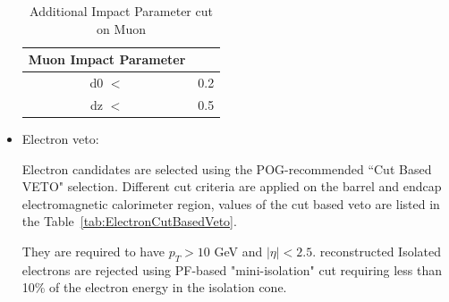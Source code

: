 \begin{itemize}
\begin{table}[htbp]
\fontsize{10 pt}{1.2 em}
\selectfont
\begin{centering}
\caption{\label{tab:MuonMediumIDImpactParameter} Additional Impact Parameter cut on Muon }
\hspace*{-4ex}
\begin{lrbox}{\closureBox}
\begin{tabular}{|c|c|}
\hline
  Muon Impact Parameter &     \\
\hline
  d0 $<$                & 0.2 \\
\hline
  dz $<$                & 0.5 \\
\hline
\end{tabular}
\end{lrbox}
\scalebox{0.80}{\usebox{\closureBox}}
\par\end{centering}
\end{table}

\item Electron veto:

Electron candidates are selected using the POG-recommended
``Cut Based VETO" selection. 
Different cut criteria are applied on the barrel and endcap electromagnetic calorimeter region, values of the cut based veto are listed in the Table~\ref{tab:ElectronCutBasedVeto}. 

They are required to have $p_{T}>10$ GeV and $|\eta|<2.5$.
reconstructed Isolated electrons are rejected using PF-based "mini-isolation" cut requiring
less than 10\% of the electron energy in the isolation cone.


\end{itemize}
